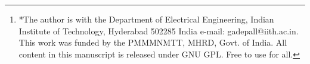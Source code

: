 %
%
%

\author{G V V Sharma$^{*}$ %
\thanks{*The author is with the Department
of Electrical Engineering, Indian Institute of Technology, Hyderabad
502285 India e-mail:  gadepall@iith.ac.in. This work was funded by the PMMMNMTT, MHRD, Govt. of India.  All content in this manuscript is released under GNU GPL.  Free to use for  all.}%
}
% 
%



% 




